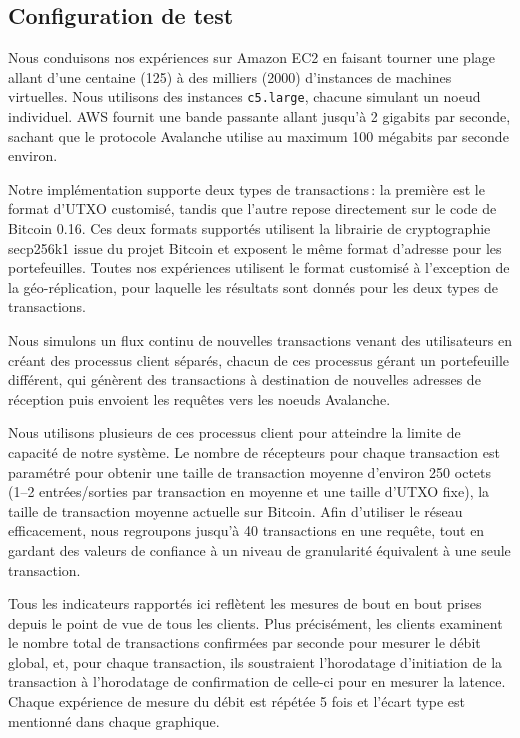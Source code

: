 \newcommand{\sysname}{Avalanche}

\subsection{Configuration de test}

Nous conduisons nos expériences sur Amazon EC2 en faisant tourner une plage allant d'une
centaine (125) à des milliers (2000) d'instances de machines virtuelles. Nous  utilisons
des instances \texttt{c5.large}, chacune simulant un noeud individuel. AWS fournit une bande passante
allant jusqu'à 2 gigabits par seconde, sachant que le protocole {\sysname} utilise au maximum 100 mégabits
par seconde environ.

Notre implémentation supporte deux types de transactions\,: la première est le format d'UTXO
customisé, tandis que l'autre repose directement sur le code de Bitcoin 0.16. Ces deux formats
supportés utilisent la librairie de cryptographie secp256k1 issue du projet Bitcoin et exposent
le même format d'adresse pour les portefeuilles. Toutes nos expériences utilisent le format
customisé à l'exception de la géo-réplication, pour laquelle les résultats sont donnés pour
les deux types de transactions.

Nous simulons un flux continu de nouvelles transactions venant des utilisateurs en créant des
processus client séparés, chacun de ces processus gérant un portefeuille différent, qui génèrent
des transactions à destination de nouvelles adresses de réception puis envoient les requêtes vers
les noeuds {\sysname}.

Nous utilisons plusieurs de ces processus client pour atteindre la limite de capacité de notre
système. Le nombre de récepteurs pour chaque transaction est paramétré pour obtenir une taille
de transaction moyenne d'environ 250 octets (1--2 entrées/sorties par transaction en moyenne et
une taille d'UTXO fixe), la taille de transaction moyenne actuelle sur Bitcoin. Afin d'utiliser
le réseau efficacement, nous regroupons jusqu'à 40 transactions en une requête, tout en gardant
des valeurs de confiance à un niveau de granularité équivalent à une seule transaction.

Tous les indicateurs rapportés ici reflètent les mesures de bout en bout prises depuis le point
de vue de tous les clients. Plus précisément, les clients examinent le nombre total de transactions
confirmées par seconde pour mesurer le débit global, et, pour chaque transaction, ils soustraient
l'horodatage d'initiation de la transaction à l'horodatage de confirmation de celle-ci pour en
mesurer la latence. Chaque expérience de mesure du débit est répétée 5 fois et l'écart type est
mentionné dans chaque graphique.

